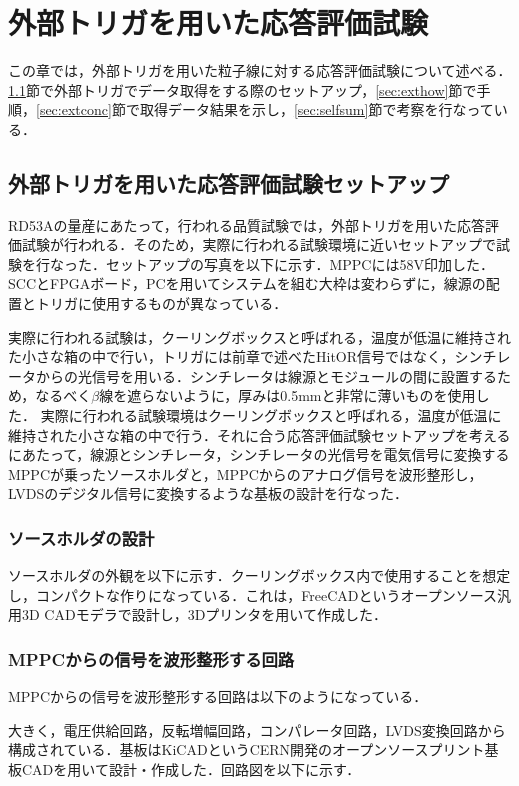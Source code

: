 \chapter{外部トリガを用いた応答評価試験}
この章では，外部トリガを用いた粒子線に対する応答評価試験について述べる．\ref{sec:extsetup}節で外部トリガでデータ取得をする際のセットアップ，\ref{sec:exthow}節で手順，\ref{sec:extconc}節で取得データ結果を示し，\ref{sec:selfsum}節で考察を行なっている．

\section{外部トリガを用いた応答評価試験セットアップ}
\label{sec:extsetup}
RD53Aの量産にあたって，行われる品質試験では，外部トリガを用いた応答評価試験が行われる．そのため，実際に行われる試験環境に近いセットアップで試験を行なった．セットアップの写真を以下に示す．MPPCには58$\mathrm{V}$印加した．SCCとFPGAボード，PCを用いてシステムを組む大枠は変わらずに，線源の配置とトリガに使用するものが異なっている．\par
実際に行われる試験は，クーリングボックスと呼ばれる，温度が低温に維持された小さな箱の中で行い，トリガには前章で述べたHitOR信号ではなく，シンチレータからの光信号を用いる．シンチレータは線源とモジュールの間に設置するため，なるべく$\beta$線を遮らないように，厚みは0.5$\mathrm{mm}$と非常に薄いものを使用した．
実際に行われる試験環境はクーリングボックスと呼ばれる，温度が低温に維持された小さな箱の中で行う．それに合う応答評価試験セットアップを考えるにあたって，線源とシンチレータ，シンチレータの光信号を電気信号に変換するMPPCが乗ったソースホルダと，MPPCからのアナログ信号を波形整形し，LVDSのデジタル信号に変換するような基板の設計を行なった．

\subsection{ソースホルダの設計}
ソースホルダの外観を以下に示す．クーリングボックス内で使用することを想定し，コンパクトな作りになっている．これは，FreeCADというオープンソース汎用3D CADモデラで設計し，3Dプリンタを用いて作成した．

\subsection{MPPCからの信号を波形整形する回路}
MPPCからの信号を波形整形する回路は以下のようになっている．\par
大きく，電圧供給回路，反転増幅回路，コンパレータ回路，LVDS変換回路から構成されている．基板はKiCADというCERN開発のオープンソースプリント基板CADを用いて設計・作成した．回路図を以下に示す．

